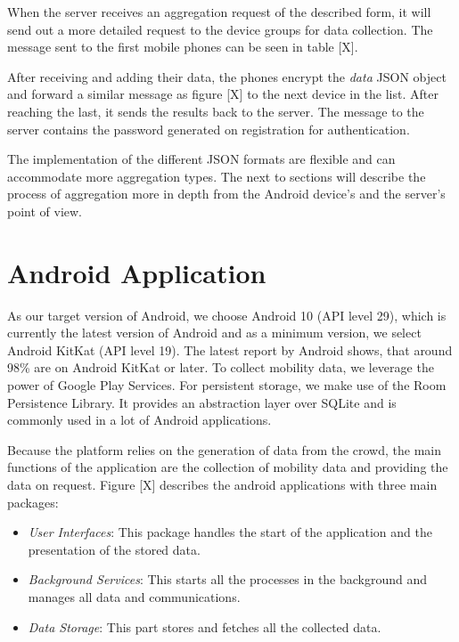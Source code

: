 When the server receives an aggregation request of the described form, it will send out a more detailed request to the device groups for data collection. The message sent to the first mobile phones can be seen in table [X].

After receiving and adding their data, the phones encrypt the \textit{data} JSON object and forward a similar message as figure [X] to the next device in the list. After reaching the last, it sends the results back to the server. The message to the server contains the password generated on registration for authentication.

The implementation of the different JSON formats are flexible and can accommodate more aggregation types. The next to sections will describe the process of aggregation more in depth from the Android device's and the server's point of view.

\section{Android Application}
As our target version of Android, we choose Android 10 (API level 29), which is currently the latest version of Android and as a minimum version, we select Android KitKat (API level 19). The latest report by Android shows, that around 98\% are on Android KitKat or later. To collect mobility data, we leverage the power of Google Play Services. For persistent storage, we make use of the Room Persistence Library. It provides an abstraction layer over SQLite and is commonly used in a lot of Android applications.

Because the platform relies on the generation of data from the crowd, the main functions of the application are the collection of mobility data and providing the data on request. Figure [X] describes the android applications with three main packages:
\begin{itemize}
	\item \textit{User Interfaces}: This package handles the start of the application and the presentation of the stored data.
	\item \textit{Background Services}: This starts all the processes in the background and manages all data and communications.
	\item \textit{Data Storage}: This part stores and fetches all the collected data.
\end{itemize}

